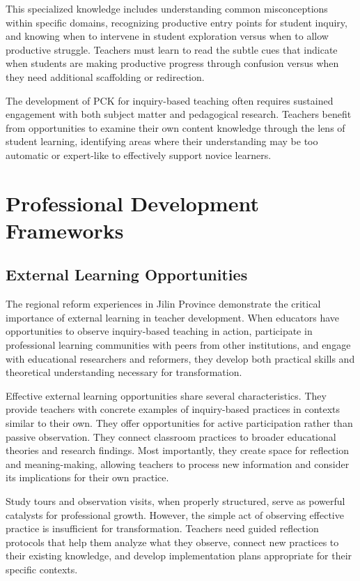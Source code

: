 \documentclass[
  Letterpaper,
]{scrbook}
\begin{document}
This specialized knowledge includes understanding common misconceptions
within specific domains, recognizing productive entry points for student
inquiry, and knowing when to intervene in student exploration versus
when to allow productive struggle. Teachers must learn to read the
subtle cues that indicate when students are making productive progress
through confusion versus when they need additional scaffolding or
redirection.

The development of PCK for inquiry-based teaching often requires
sustained engagement with both subject matter and pedagogical research.
Teachers benefit from opportunities to examine their own content
knowledge through the lens of student learning, identifying areas where
their understanding may be too automatic or expert-like to effectively
support novice learners.

\section{Professional Development
Frameworks}\label{professional-development-frameworks}

\subsection{External Learning
Opportunities}\label{external-learning-opportunities}

The regional reform experiences in Jilin Province demonstrate the
critical importance of external learning in teacher development. When
educators have opportunities to observe inquiry-based teaching in
action, participate in professional learning communities with peers from
other institutions, and engage with educational researchers and
reformers, they develop both practical skills and theoretical
understanding necessary for transformation.

Effective external learning opportunities share several characteristics.
They provide teachers with concrete examples of inquiry-based practices
in contexts similar to their own. They offer opportunities for active
participation rather than passive observation. They connect classroom
practices to broader educational theories and research findings. Most
importantly, they create space for reflection and meaning-making,
allowing teachers to process new information and consider its
implications for their own practice.

Study tours and observation visits, when properly structured, serve as
powerful catalysts for professional growth. However, the simple act of
observing effective practice is insufficient for transformation.
Teachers need guided reflection protocols that help them analyze what
they observe, connect new practices to their existing knowledge, and
develop implementation plans appropriate for their specific contexts.
\end{document}
